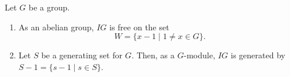 Let $G$ be a group.
\begin{enumerate}
\item[(i)] As an abelian group, $IG$ is free on the set
$$W = \{x - 1 \mid 1 \neq x \in G\}.$$
\item[(ii)] Let $S$ be a generating set for $G$. Then, as a $G$-module, $IG$ is generated by $S - 1 = \{s - 1 \mid s \in S\}$.
\end{enumerate}
